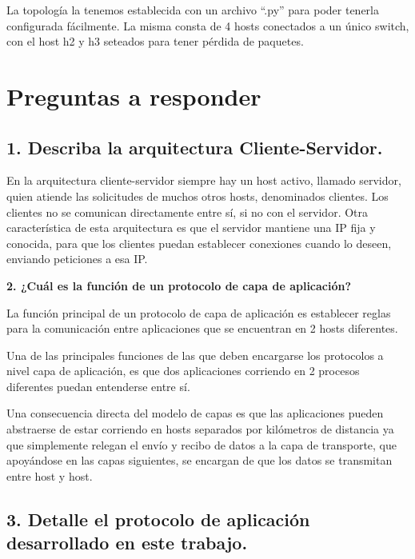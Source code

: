\documentclass{article}
\begin{document}
La topología la tenemos establecida con un archivo ``.py'' para poder tenerla configurada fácilmente. La misma consta de 4 hosts conectados a un único switch, con el host h2 y h3 seteados para tener pérdida de
paquetes.

\section{\texorpdfstring{\textbf{Preguntas a responder}}{Preguntas a responder}}\label{preguntas-a-responder}

\subsection{\texorpdfstring{\textbf{1. Describa la arquitectura Cliente-Servidor.}}{1. Describa la arquitectura Cliente-Servidor.}}\label{describa-la-arquitectura-cliente-servidor.}

En la arquitectura cliente-servidor siempre hay un host activo, llamado servidor, quien atiende las solicitudes de muchos otros hosts, denominados clientes. Los clientes no se comunican directamente entre sí, si no con el servidor. Otra característica de esta arquitectura es que el servidor mantiene una IP fija y conocida, para que los clientes puedan establecer conexiones cuando lo deseen, enviando peticiones a esa IP.

\textbf{2. ¿Cuál es la función de un protocolo de capa de aplicación?}

La función principal de un protocolo de capa de aplicación es establecer reglas para la comunicación entre aplicaciones que se encuentran en 2 hosts diferentes.

Una de las principales funciones de las que deben encargarse los protocolos a nivel capa de aplicación, es que dos aplicaciones corriendo en 2 procesos diferentes puedan entenderse entre sí.

Una consecuencia directa del modelo de capas es que las aplicaciones pueden abstraerse de estar corriendo en hosts separados por kilómetros de distancia ya que simplemente relegan el envío y recibo de datos a la capa de transporte, que apoyándose en las capas siguientes, se encargan de que los datos se transmitan entre host y host.

\subsection{\texorpdfstring{\textbf{3. Detalle el protocolo de
aplicación desarrollado en este trabajo.}}{3. Detalle el protocolo de aplicación desarrollado en este trabajo.}}\label{detalle-el-protocolo-de-aplicaciuxf3n-desarrollado-en-este-trabajo.}
\end{document}
